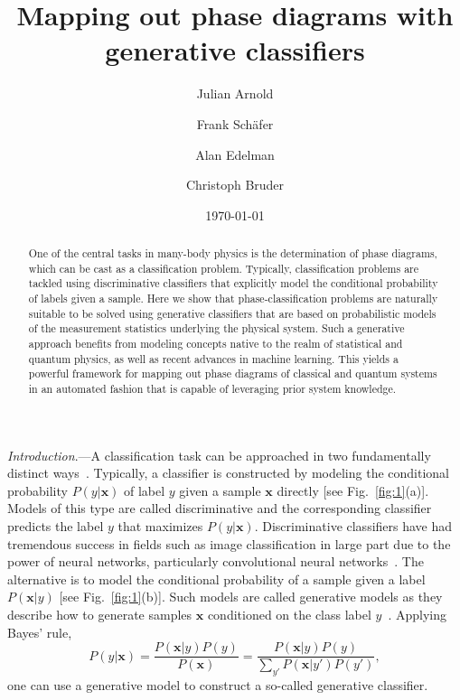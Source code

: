 \documentclass[twocolumn,aps,prl,superscriptaddress,tightlines,nofootinbib]{revtex4-2}
\begin{document}
\title{Mapping out phase diagrams with generative classifiers}
\author{Julian Arnold}
\author{Frank Sch\"afer}
\author{Alan Edelman}
 \author{Christoph Bruder}
\date{\today}

\begin{abstract}
One of the central tasks in many-body physics is the determination of phase diagrams, which can be cast as a classification problem. Typically, classification problems are tackled using discriminative classifiers that explicitly model the conditional probability of labels given a sample. Here we show that phase-classification problems are naturally suitable to be solved using generative classifiers that are based on probabilistic models of the measurement statistics underlying the physical system. Such a generative approach benefits from modeling concepts native to the realm of statistical and quantum physics, as well as recent advances in machine learning. This yields a powerful framework for mapping out phase diagrams of classical and quantum systems in an automated fashion that is capable of leveraging prior system knowledge.
\end{abstract}

\maketitle
\emph{Introduction}.---A classification task can be approached in two fundamentally distinct ways~\cite{ng:2001}. Typically, a classifier is constructed by modeling the conditional probability $P(y|\bm{x})$ of label $y$ given a sample $\bm{x}$ directly [see Fig.~\ref{fig:1}(a)]. Models of this type are called discriminative and the corresponding classifier predicts the label $y$ that maximizes $P(y|\bm{x})$. Discriminative classifiers have had tremendous success in fields such as image classification in large part due to the power of neural networks, particularly convolutional neural networks~\cite{krizhevsky:2012}. The alternative is to model the conditional probability of a sample given a label $P(\bm{x}|y)$ [see Fig.~\ref{fig:1}(b)]. Such models are called generative models as they describe how to generate samples $\bm{x}$ conditioned on the class label $y$~\cite{gen_vs_disc}. Applying Bayes' rule,
\begin{equation}\label{eq:Bayes_1}
    P(y|\bm{x}) = \frac{P(\bm{x}|y)P(y)}{P(\bm{x})} = \frac{P(\bm{x}|y)P(y)}{\sum_{y'} P(\bm{x}|y')P(y')},
\end{equation}
one can use a generative model to construct a so-called generative classifier.
\end{document}
